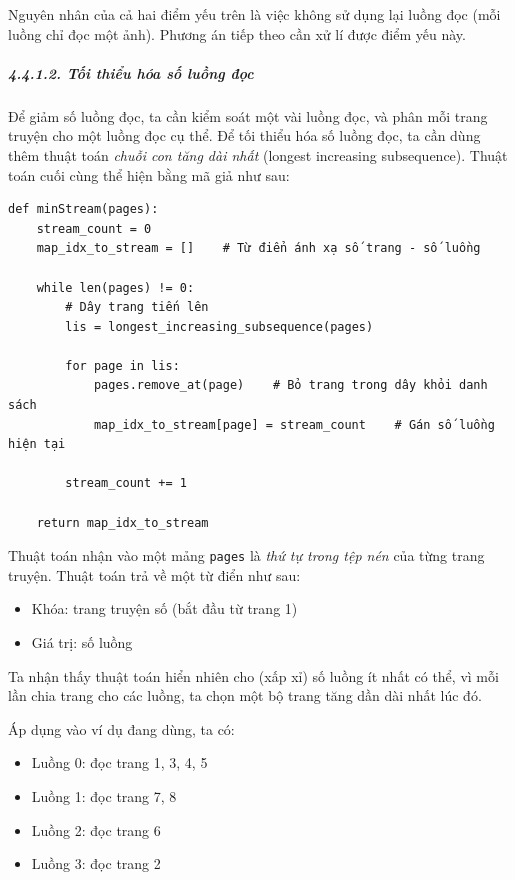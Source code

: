 \documentclass[
]{article}
\providecommand{\tightlist}{%
  \setlength{\itemsep}{0pt}\setlength{\parskip}{0pt}}
\begin{document}
Nguyên nhân của cả hai điểm yếu trên là việc không sử dụng lại luồng đọc
(mỗi luồng chỉ đọc một ảnh). Phương án tiếp theo cần xử lí được điểm yếu
này.

\hypertarget{tux1ed1i-thiux1ec3u-huxf3a-sux1ed1-luux1ed3ng-ux111ux1ecdc}{%
\subparagraph{4.4.1.2. Tối thiểu hóa số luồng
đọc}\label{tux1ed1i-thiux1ec3u-huxf3a-sux1ed1-luux1ed3ng-ux111ux1ecdc}}

Để giảm số luồng đọc, ta cần kiểm soát một vài luồng đọc, và phân mỗi
trang truyện cho một luồng đọc cụ thể. Để tối thiểu hóa số luồng đọc, ta
cần dùng thêm thuật toán \emph{chuỗi con tăng dài nhất} (longest
increasing subsequence). Thuật toán cuối cùng thể hiện bằng mã giả như
sau:

\begin{verbatim}
def minStream(pages):
    stream_count = 0
    map_idx_to_stream = []    # Từ điển ánh xạ số trang - số luồng

    while len(pages) != 0:
        # Dây trang tiến lên
        lis = longest_increasing_subsequence(pages)

        for page in lis:
            pages.remove_at(page)    # Bỏ trang trong dây khỏi danh sách
            map_idx_to_stream[page] = stream_count    # Gán số luồng hiện tại

        stream_count += 1

    return map_idx_to_stream
\end{verbatim}

Thuật toán nhận vào một mảng \texttt{pages} là \emph{thứ tự trong tệp
nén} của từng trang truyện. Thuật toán trả về một từ điển như sau:

\begin{itemize}
\tightlist
\item
  Khóa: trang truyện số (bắt đầu từ trang 1)
\item
  Giá trị: số luồng
\end{itemize}

Ta nhận thấy thuật toán hiển nhiên cho (xấp xỉ) số luồng ít nhất có thể,
vì mỗi lần chia trang cho các luồng, ta chọn một bộ trang tăng dần dài
nhất lúc đó.

Áp dụng vào ví dụ đang dùng, ta có:

\begin{itemize}
\tightlist
\item
  Luồng 0: đọc trang 1, 3, 4, 5
\item
  Luồng 1: đọc trang 7, 8
\item
  Luồng 2: đọc trang 6
\item
  Luồng 3: đọc trang 2
\end{itemize}
\end{document}
